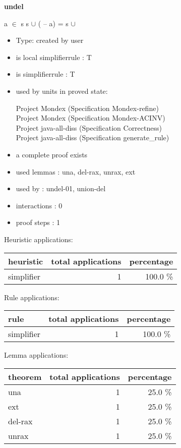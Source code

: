 \documentclass[a4paper]{article}
\begin{document}
{\LARGE\bf undel}\label{lemma-undel}

\medskip

 \Fol a $\in$ s \Imp s $\cup$ ( -- a) = s $\cup$ 

\begin{itemize}

\item Type: created by user

\item is local simplifierrule : T
\item is simplifierrule : T
\item used by units in proved state:

Project Mondex (Specification Mondex-refine) \\
Project Mondex (Specification Mondex-ACINV) \\
Project java-all-diss (Specification Correctness) \\
Project java-all-diss (Specification generate\_rule)
\item       a complete proof exists
\item       used lemmas  : una, del-rax, unrax, ext
\item       used by      : undel-01, union-del
\item       interactions : 0
\item       proof steps  : 1
\end{itemize}

\medskip


Heuristic applications:

\begin{supertabular}{l|r|r}
heuristic	& total applications & percentage \\ \hline
simplifier & 1 & 100.0 \% \\

\end{supertabular}

Rule applications:

\begin{supertabular}{l|r|r}
rule	        & total applications & percentage \\ \hline
simplifier & 1 & 100.0 \% \\

\end{supertabular}

Lemma applications:

\begin{supertabular}{l|r|r}
theorem	        & total applications & percentage \\ \hline
una & 1 & 25.0 \% \\
ext & 1 & 25.0 \% \\
del-rax & 1 & 25.0 \% \\
unrax & 1 & 25.0 \% \\

\end{supertabular}
\pagebreak
\end{document}
